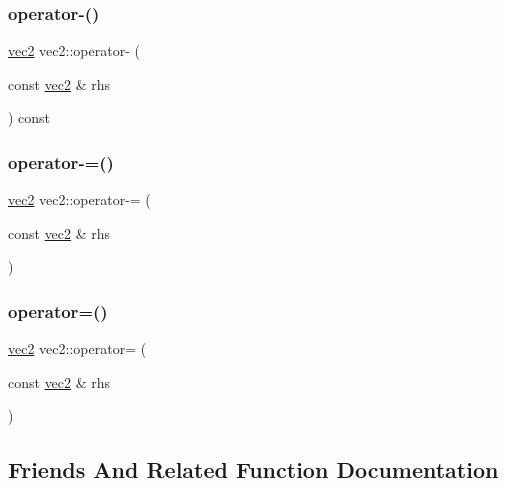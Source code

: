 \mbox{\label{structvec2_a8951488e5d92bbd54212bacc0753c079}} 
\subsubsection{\texorpdfstring{operator-\/()}{operator-()}}
{\footnotesize\ttfamily \hyperlink{structvec2}{vec2} vec2\+::operator-\/ (\begin{DoxyParamCaption}\item[{const \hyperlink{structvec2}{vec2} \&}]{rhs }\end{DoxyParamCaption}) const}

\mbox{\label{structvec2_af53cb37ea6fd794dbdaf1a1de9a5cf5c}} 
\subsubsection{\texorpdfstring{operator-\/=()}{operator-=()}}
{\footnotesize\ttfamily \hyperlink{structvec2}{vec2} vec2\+::operator-\/= (\begin{DoxyParamCaption}\item[{const \hyperlink{structvec2}{vec2} \&}]{rhs }\end{DoxyParamCaption})}

\mbox{\label{structvec2_a3cb4130bbf48a0234bbd70a6e5603bb2}} 
\subsubsection{\texorpdfstring{operator=()}{operator=()}}
{\footnotesize\ttfamily \hyperlink{structvec2}{vec2} vec2\+::operator= (\begin{DoxyParamCaption}\item[{const \hyperlink{structvec2}{vec2} \&}]{rhs }\end{DoxyParamCaption})}



\subsection{Friends And Related Function Documentation}
\mbox{\label{structvec2_a85b47f3582472fa5e3f80e6efd59f1d6}} 
